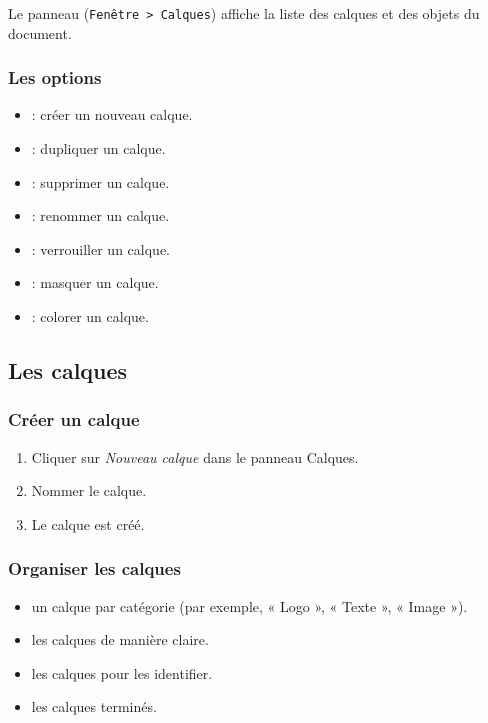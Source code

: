 Le panneau  (\texttt{Fenêtre > Calques}) affiche la liste des calques et des objets du document.

\subsubsection{Les options}

\begin{itemize}
    \item {} : créer un nouveau calque.
    \item {} : dupliquer un calque.
    \item {} : supprimer un calque.
    \item {} : renommer un calque.
    \item {} : verrouiller un calque.
    \item {} : masquer un calque.
    \item {} : colorer un calque.
\end{itemize}

\subsection{Les calques}

\subsubsection{Créer un calque}

\begin{enumerate}
    \item Cliquer sur \emph{Nouveau calque} dans le panneau Calques.
    \item Nommer le calque.
    \item Le calque est créé.
\end{enumerate}

\subsubsection{Organiser les calques}

\begin{itemize}
    \item {} un calque par catégorie (par exemple, « Logo », « Texte », « Image »).
    \item {} les calques de manière claire.
    \item {} les calques pour les identifier.
    \item {} les calques terminés.
\end{itemize}


